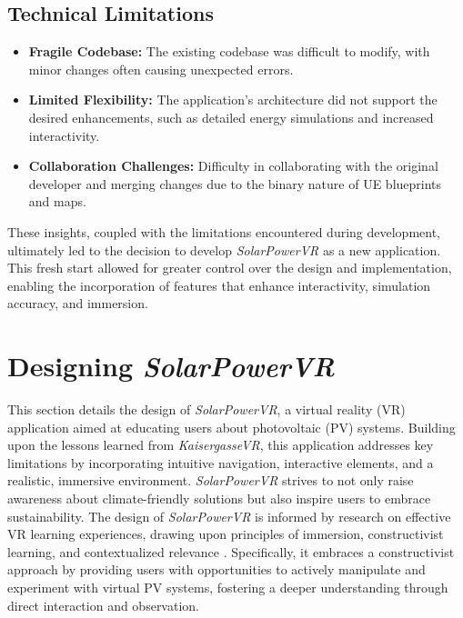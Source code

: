 \documentclass[draft, final]{vutinfth} %
\begin{document}
\subsection{Technical Limitations}
\begin{itemize}
    \item \textbf{Fragile Codebase:} The existing codebase was difficult to modify, with minor changes often causing unexpected errors.
    \item \textbf{Limited Flexibility:} The application's architecture did not support the desired enhancements, such as detailed energy simulations and increased interactivity.
    \item \textbf{Collaboration Challenges:} Difficulty in collaborating with the original developer and merging changes due to the binary nature of UE blueprints and maps.
\end{itemize}

These insights, coupled with the limitations encountered during development, ultimately led to the decision to develop \textit{SolarPowerVR} as a new application. This fresh start allowed for greater control over the design and implementation, enabling the incorporation of features that enhance interactivity, simulation accuracy, and immersion.

\section{Designing \textit{SolarPowerVR}}

This section details the design of \textit{SolarPowerVR}, a virtual reality (VR) application aimed at educating users about photovoltaic (PV) systems. Building upon the lessons learned from \textit{KaisergasseVR}, this application addresses key limitations by incorporating intuitive navigation, interactive elements, and a realistic, immersive environment. \textit{SolarPowerVR} strives to not only raise awareness about climate-friendly solutions but also inspire users to embrace sustainability. The design of \textit{SolarPowerVR} is informed by research on effective VR learning experiences, drawing upon principles of immersion, constructivist learning, and contextualized relevance \cite{Dalgarno2010Learning, Gee2009Deep, HuAu2018VrExperience, Mikropoulos2011VrEducational, Winn2002Immersion}.  Specifically, it embraces a constructivist approach by providing users with opportunities to actively manipulate and experiment with virtual PV systems, fostering a deeper understanding through direct interaction and observation.
\end{document}
